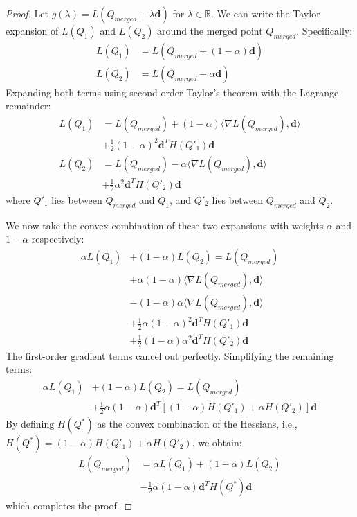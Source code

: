 \documentclass{article}
\theoremstyle{plain}
\theoremstyle{definition}
\theoremstyle{remark}
\begin{document}
\begin{proof}
Let $g(\lambda) = L(Q_{merged} + \lambda \mathbf{d})$ for $\lambda \in \mathbb{R}$. We can write the Taylor expansion of $L(Q_1)$ and $L(Q_2)$ around the merged point $Q_{merged}$. Specifically:
\begin{align}
    L(Q_1) &= L(Q_{merged} + (1-\alpha)\mathbf{d}) \\
    L(Q_2) &= L(Q_{merged} - \alpha\mathbf{d})
\end{align}
Expanding both terms using second-order Taylor's theorem with the Lagrange remainder:
\begin{align}
    L(Q_1) &= L(Q_{merged}) + (1-\alpha) \langle \nabla L(Q_{merged}), \mathbf{d} \rangle \nonumber \\
    &+ \frac{1}{2} (1-\alpha)^2 \mathbf{d}^T H(Q'_1) \mathbf{d} \\
    L(Q_2) &= L(Q_{merged}) - \alpha \langle \nabla L(Q_{merged}), \mathbf{d} \rangle \nonumber \\
    &+ \frac{1}{2} \alpha^2 \mathbf{d}^T H(Q'_2) \mathbf{d}
\end{align}
where $Q'_1$ lies between $Q_{merged}$ and $Q_1$, and $Q'_2$ lies between $Q_{merged}$ and $Q_2$.

We now take the convex combination of these two expansions with weights $\alpha$ and $1-\alpha$ respectively:
\begin{align}
    \alpha L(Q_1) &+ (1-\alpha) L(Q_2) = L(Q_{merged}) \nonumber \\
    &+ \alpha(1-\alpha) \langle \nabla L(Q_{merged}), \mathbf{d} \rangle \nonumber \\
    &- (1-\alpha)\alpha \langle \nabla L(Q_{merged}), \mathbf{d} \rangle \nonumber \\
    &+ \frac{1}{2} \alpha(1-\alpha)^2 \mathbf{d}^T H(Q'_1) \mathbf{d} \nonumber \\
    &+ \frac{1}{2} (1-\alpha)\alpha^2 \mathbf{d}^T H(Q'_2) \mathbf{d}
\end{align}
The first-order gradient terms cancel out perfectly. Simplifying the remaining terms:
\begin{align}
    \alpha L(Q_1) &+ (1-\alpha) L(Q_2) = L(Q_{merged}) \nonumber \\
    &+ \frac{1}{2} \alpha(1-\alpha) \mathbf{d}^T \left[ (1-\alpha) H(Q'_1) + \alpha H(Q'_2) \right] \mathbf{d}
\end{align}
By defining $H(Q^*)$ as the convex combination of the Hessians, i.e., $H(Q^*) = (1-\alpha) H(Q'_1) + \alpha H(Q'_2)$, we obtain:
\begin{align}
    L(Q_{merged}) &= \alpha L(Q_1) + (1-\alpha) L(Q_2) \nonumber \\
    &- \frac{1}{2} \alpha(1-\alpha) \mathbf{d}^T H(Q^*) \mathbf{d}
\end{align}
which completes the proof.
\end{proof}
\end{document}
